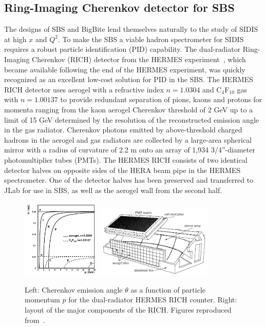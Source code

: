 \subsection{Ring-Imaging Cherenkov detector for SBS}
The designs of SBS and BigBite lend themselves naturally to the study of SIDIS at high $x$ and $Q^2$. To make the SBS a viable hadron spectrometer for SIDIS requires a robust particle identification (PID) capability. The dual-radiator Ring-Imaging Cherenkov (RICH) detector from the HERMES experiment~\cite{HERMES_RICH_long_NIM}, which became available following the end of the HERMES experiment, was quickly recognized as an excellent low-cost solution for PID in the SBS. The HERMES RICH detector uses aerogel with a refractive index $n = 1.0304$ and C$_4$F$_{10}$ gas with $n = 1.00137$ to provide redundant separation of pions, kaons and protons for momenta ranging from the kaon aerogel Cherenkov threshold of 2 GeV up to a limit of 15 GeV determined by the resolution of the reconstructed emission angle in the gas radiator. Cherenkov photons emitted by above-threshold charged hadrons in the aerogel and gas radiators are collected by a large-area spherical mirror with a radius of curvature of 2.2 m onto an array of 1,934 3/4''-diameter photomultiplier tubes (PMTs). The HERMES RICH consists of two identical detector halves on opposite sides of the HERA beam pipe in the HERMES spectrometer. One of the detector halves has been preserved and transferred to JLab for use in SBS, as well as the aerogel wall from the second half.
\begin{figure}[h]
  \begin{center}
    \includegraphics[width=0.33\textwidth]{figures/thetaC_vs_p.png}
    \includegraphics[width=0.5\textwidth]{figures/RICH_schematic.png}
  \end{center}
  \caption{\label{RICHfig1} Left: Cherenkov emission angle $\theta$ as a function of particle momentum $p$ for the dual-radiator HERMES RICH counter. Right: layout of the major components of the RICH. Figures reproduced from~\cite{HERMES_RICH_long_NIM}.}
\end{figure}
